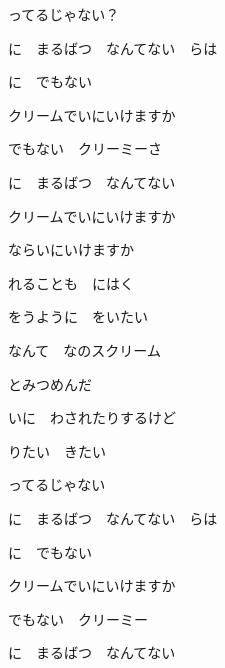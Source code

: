 \documentclass[a4paper,tate,twocolumn,12pt]{ltjtarticle}
\begin{document}
\begin{flushleft}
\begin{minipage}{\linewidth}
ってるじゃない？
\end{minipage}

\vspace{2em}

\noindent\begin{minipage}{\linewidth}
に　まるばつ　なんてない　らは

に　でもない

クリームでいにいけますか

でもない　クリーミーさ

に　まるばつ　なんてない

クリームでいにいけますか

ならいにいけますか
\end{minipage}

\vspace{2em}

\noindent\begin{minipage}{\linewidth}
れることも　にはく

をうように　をいたい

なんて　なのスクリーム

とみつめんだ

いに　わされたりするけど

りたい　きたい

ってるじゃない
\end{minipage}

\vspace{2em}

\noindent\begin{minipage}{\linewidth}
に　まるばつ　なんてない　らは

に　でもない

クリームでいにいけますか

でもない　クリーミー

に　まるばつ　なんてない


\end{minipage}
\end{flushleft}
\end{document}
